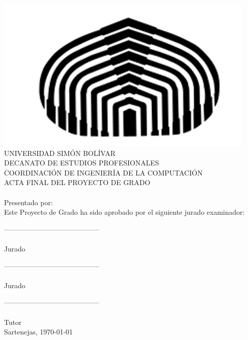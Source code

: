 \begin{center}
	\includegraphics{imagenes/cebolla.png} \\
	UNIVERSIDAD SIMÓN BOLÍVAR \\
	DECANATO DE ESTUDIOS PROFESIONALES \\
	COORDINACIÓN DE INGENIERÍA DE LA COMPUTACIÓN \\
	\vspace{0.5cm}
	ACTA FINAL DEL PROYECTO DE GRADO \\
	\vspace{0.4cm}
	\textbf{\titulo} \\
	\vspace{0.5cm}
	Presentado por: \\
	\autores
	\vspace{0.6cm}
	Este Proyecto de Grado ha sido aprobado por 
	el siguiente jurado examinador: \\
	\vspace{0.6cm}
	
	----------------------------------------- \\
	\juradouno \\
	Jurado \\
	\vspace{1cm}
	
	----------------------------------------- \\
	\juradodos \\
	Jurado \\
	\vspace{1cm}
	
	----------------------------------------- \\
	\tutor \\
	Tutor \\
	\vspace{0.4cm}
	Sartenejas, \today
\end{center}